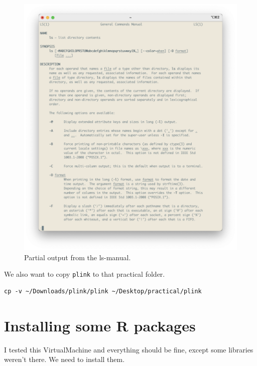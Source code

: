 \documentclass[
]{book}
\newcommand{\passthrough}[1]{#1}
\begin{document}
\begin{figure}

{\centering \includegraphics[width=22.64in]{img/ls_manual} 

}

\caption{Partial output from the ls-manual.}\label{fig:ls-manual}
\end{figure}

We also want to copy \passthrough{\lstinline!plink!} to that practical folder.

\begin{lstlisting}
cp -v ~/Downloads/plink/plink ~/Desktop/practical/plink 
\end{lstlisting}

\hypertarget{installing-some-r-packages}{%
\section{Installing some R packages}\label{installing-some-r-packages}}

I tested this VirtualMachine and everything should be fine, except some libraries weren't there. We need to install them.
\end{document}
